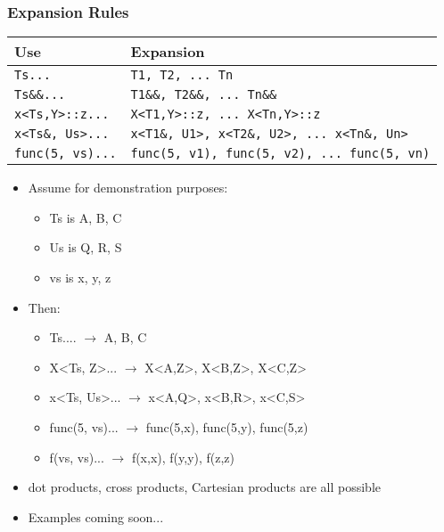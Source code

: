 \begin{frame}[fragile,t]
\frametitle{Expansion Rules}

\begin{tabular}{ll}
\hline
Use & Expansion \\ \hline
\texttt{Ts...} & \texttt{T1, T2, ... Tn} \\
\texttt{Ts\&\&...}& \texttt{T1\&\&, T2\&\&, ... Tn\&\&} \\
\texttt{x<Ts,Y>::z...}& \texttt{X<T1,Y>::z, ... X<Tn,Y>::z} \\
\texttt{x<Ts\&, Us>...}& \texttt{x<T1\&, U1>, x<T2\&, U2>, ... x<Tn\&, Un>} \\
\texttt{func(5, vs)...}& \texttt{func(5, v1), func(5, v2), ... func(5, vn)} \\ \hline
\end{tabular}

\begin{itemize}[<+->]
\item Assume for demonstration purposes:
\begin{itemize}
  \item Ts is A, B, C
  \item Us is Q, R, S
  \item vs is x, y, z
\end{itemize}
\item Then:
    \begin{itemize}
      \item Ts.... $\to$ A, B, C
      \item X<Ts, Z>... $\to$ X<A,Z>, X<B,Z>, X<C,Z>
      \item x<Ts, Us>... $\to$ x<A,Q>, x<B,R>, x<C,S>
      \item func(5, vs)... $\to$ func(5,x), func(5,y), func(5,z)
      \item f(vs, vs)... $\to$ f(x,x), f(y,y), f(z,z)  
\end{itemize}
\item dot products, cross products, Cartesian products are all
  possible
\item Examples coming soon...
\end{itemize}


\end{frame}


